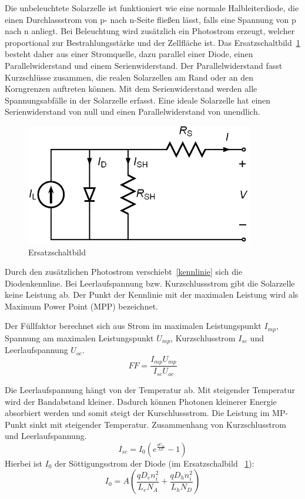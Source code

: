 \documentclass[a4paper,bibtotoc,oneside]{scrbook}
\begin{document}
Die unbeleuchtete Solarzelle ist funktioniert wie eine normale Halbleiterdiode, die einen Durchlassstrom von p- nach n-Seite fließen lässt, falls eine Spannung von p nach n anliegt. Bei Beleuchtung wird zusätzlich ein Photostrom erzeugt, welcher proportional zur Bestrahlungsstärke und der Zellfläche ist. Das Ersatzschaltbild~\ref{esb} besteht daher aus einer Stromquelle, dazu parallel einer Diode, einen Parallelwiderstand und einem Serienwiderstand. Der Parallelwiderstand fasst Kurzschlüsse zusammen, die realen Solarzellen am Rand oder an den Korngrenzen auftreten können. Mit dem Serienwiderstand werden alle Spannungsabfälle in der Solarzelle erfasst. Eine ideale Solarzelle hat einen Serienwiderstand von null und einen Parallelwiderstand von unendlich. 
\begin{figure}[htbp]
\centering
\includegraphics[width=100mm]{img/esb.png}
\caption{Ersatzschaltbild}\label{esb}
\end{figure}

Durch den zusätzlichen Photostrom verschiebt~\ref{kennlinie} sich die Diodenkennline. Bei Leerlaufspannung bzw. Kurzschlussstrom gibt die Solarzelle keine Leistung ab. Der Punkt der Kennlinie mit der maximalen Leistung wird als Maximum Power Point (MPP) bezeichnet.

Der Füllfaktor berechnet sich aus Strom im maximalen Leistungspunkt $I_{mp}$, Spannung am maximalen Leistungspunkt $U_{mp}$, Kurzschlusstrom $I_{sc}$ und Leerlaufspannung $U_{oc}$.
  \begin{equation}
     FF = \frac {I_{mp} U_{mp}} {I_{sc} U_{oc}}
  \end{equation}
  
Die Leerlaufspannung hängt von der Temperatur ab. Mit steigender Temperatur wird der Bandabstand kleiner. Dadurch können Photonen kleinerer Energie absorbiert werden und somit steigt der Kurschlussstrom. Die Leistung im MP-Punkt sinkt mit steigender Temperatur.
Zusammenhang von Kurzschlusstrom und Leerlaufspannung.
  \begin{equation}
     I_{sc} = I_0 ( e^{\frac {q U_{oc}}{k T}} - 1 )
  \end{equation}
  Hierbei ist $I_{0}$ der Söttigungsstrom der Diode (im Ersatzschalbild ~\ref{esb}):
    \begin{equation}
     I_{0} = A ( \frac { q D_{e} n_i^2} {L_e N_A} + \frac {q D_h n_i^2} {L_h N_D})
  \end{equation}
  
\end{document}
